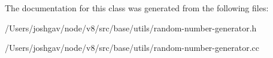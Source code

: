 The documentation for this class was generated from the following files\+:\begin{DoxyCompactItemize}
\item 
/\+Users/joshgav/node/v8/src/base/utils/random-\/number-\/generator.\+h\item 
/\+Users/joshgav/node/v8/src/base/utils/random-\/number-\/generator.\+cc\end{DoxyCompactItemize}
